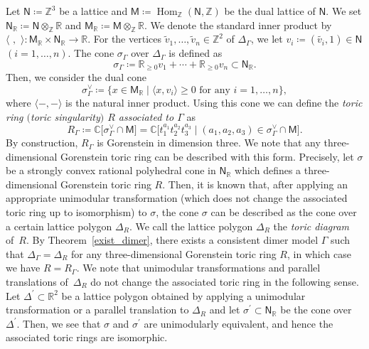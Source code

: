 \documentclass[10pt,a4paper]{amsart}
\numberwithin{equation}{section}
\theoremstyle{definition}
\newcommand{\ZZ}{\mathbb{Z}}
\newcommand{\RR}{\mathbb{R}}
\newcommand{\CC}{\mathbb{C}}
\newcommand{\sfM}{\mathsf{M}}
\newcommand{\sfN}{\mathsf{N}}
\newcommand{\Hom}{\operatorname{Hom}}
\begin{document}
Let $\sfN\coloneqq \ZZ^3$ be a lattice and $\sfM\coloneqq\Hom_\ZZ(\sfN,\ZZ)$ be the dual lattice of $\sfN$.
We set $\sfN_\RR\coloneqq\sfN\otimes_\ZZ \RR$ and $\sfM_\RR\coloneqq\sfM\otimes_\ZZ \RR$.
We denote the standard inner product by $\langle\,\, , \,\,\rangle\colon \sfM_\RR\times \sfN_\RR\rightarrow \RR$.
For the vertices $\widetilde{v}_1,\dots, \widetilde{v}_n\in\ZZ^2$ of $\Delta_\Gamma$,
we let $v_i\coloneqq (\widetilde{v_i}, 1)\in\sfN$ $(i=1, \dots, n)$. The cone $\sigma_\Gamma$ over $\Delta_\Gamma$ is defined as
\[
\sigma_\Gamma\coloneqq\RR_{\ge0}v_1+\cdots +\RR_{\ge0}v_n \subset\sfN_\RR.
\]
Then, we consider the dual cone
\[
\sigma_\Gamma^\vee\coloneqq\{x\in\sfM_\RR \mid \langle x, v_i\rangle\ge0 \text{ for any } i=1,\dots,n \},
\]
where $\langle - ,- \rangle$ is the natural inner product.
Using this cone we can define the \emph{toric ring $($toric singularity$)$ $R$ associated to $\Gamma$} as
\[
R_\Gamma\coloneqq \CC\bigl[\sigma_\Gamma^\vee\cap\sfM\bigr]=\CC\bigl[t_1^{a_1}t_2^{a_2} t_3^{a_3}\mid (a_1,a_2,a_3)\in\sigma_\Gamma^\vee\cap\sfM\bigr].
\]
By construction, $R_\Gamma$ is Gorenstein in dimension three.
We note that any three-dimensional Gorenstein toric ring can be described with this form.
Precisely,
let $\sigma$ be a strongly convex rational polyhedral cone in $\sfN_\RR$ which defines a three-dimensional Gorenstein toric ring $R$.
Then, it is known that, after applying an appropriate unimodular transformation (which does not change the associated toric ring up to isomorphism) to $\sigma$,
the cone $\sigma$ can be described as the cone over a certain lattice polygon $\Delta_R$.
We call the lattice polygon $\Delta_R$ the \emph{toric diagram} of~$R$.
By Theorem~\ref{exist_dimer}, there exists a consistent dimer model $\Gamma$ such that $\Delta_\Gamma=\Delta_R$ for any three-dimensional Gorenstein toric ring $R$, in which case we have $R=R_\Gamma$.
We note that unimodular transformations and parallel translations of~$\Delta_R$ do not change the associated toric ring in the following sense.
Let $\Delta^\prime\subset\RR^2$ be a lattice polygon obtained by applying a unimodular transformation or a parallel translation to $\Delta_R$
and let $\sigma^\prime\subset\sfN_\RR$ be the cone over $\Delta^\prime$.
Then, we see that $\sigma$ and $\sigma^\prime$ are unimodularly equivalent, and hence the associated toric rings are isomorphic.
\end{document}
